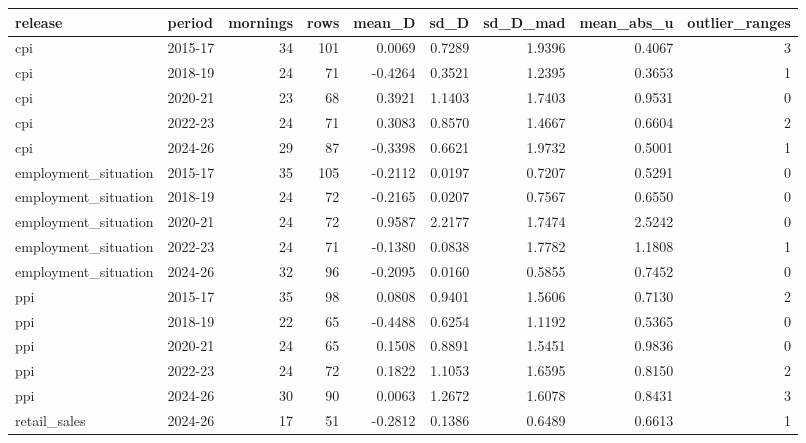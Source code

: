 \begin{tabular}{llrrrrrrr}
\toprule
release & period & mornings & rows & mean_D & sd_D & sd_D_mad & mean_abs_u & outlier_ranges \\
\midrule
cpi & 2015-17 & 34 & 101 & 0.0069 & 0.7289 & 1.9396 & 0.4067 & 3 \\
cpi & 2018-19 & 24 & 71 & -0.4264 & 0.3521 & 1.2395 & 0.3653 & 1 \\
cpi & 2020-21 & 23 & 68 & 0.3921 & 1.1403 & 1.7403 & 0.9531 & 0 \\
cpi & 2022-23 & 24 & 71 & 0.3083 & 0.8570 & 1.4667 & 0.6604 & 2 \\
cpi & 2024-26 & 29 & 87 & -0.3398 & 0.6621 & 1.9732 & 0.5001 & 1 \\
employment_situation & 2015-17 & 35 & 105 & -0.2112 & 0.0197 & 0.7207 & 0.5291 & 0 \\
employment_situation & 2018-19 & 24 & 72 & -0.2165 & 0.0207 & 0.7567 & 0.6550 & 0 \\
employment_situation & 2020-21 & 24 & 72 & 0.9587 & 2.2177 & 1.7474 & 2.5242 & 0 \\
employment_situation & 2022-23 & 24 & 71 & -0.1380 & 0.0838 & 1.7782 & 1.1808 & 1 \\
employment_situation & 2024-26 & 32 & 96 & -0.2095 & 0.0160 & 0.5855 & 0.7452 & 0 \\
ppi & 2015-17 & 35 & 98 & 0.0808 & 0.9401 & 1.5606 & 0.7130 & 2 \\
ppi & 2018-19 & 22 & 65 & -0.4488 & 0.6254 & 1.1192 & 0.5365 & 0 \\
ppi & 2020-21 & 24 & 65 & 0.1508 & 0.8891 & 1.5451 & 0.9836 & 0 \\
ppi & 2022-23 & 24 & 72 & 0.1822 & 1.1053 & 1.6595 & 0.8150 & 2 \\
ppi & 2024-26 & 30 & 90 & 0.0063 & 1.2672 & 1.6078 & 0.8431 & 3 \\
retail_sales & 2024-26 & 17 & 51 & -0.2812 & 0.1386 & 0.6489 & 0.6613 & 1 \\
\bottomrule
\end{tabular}
